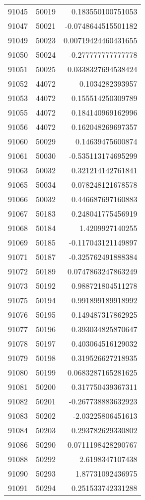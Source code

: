 \begin{tabular}{r | r | r}
91045 & 50019 & 0.183550100751053 \\
91047 & 50021 & -0.0748644515501182 \\
91049 & 50023 & 0.00719424460431655 \\
91050 & 50024 & -0.277777777777778 \\
91051 & 50025 & 0.0338327694538424 \\
91052 & 44072 & 0.1034282393957 \\
91053 & 44072 & 0.155514250309789 \\
91055 & 44072 & 0.184140969162996 \\
91056 & 44072 & 0.162048269697357 \\
91060 & 50029 & 0.14639475600874 \\
91061 & 50030 & -0.535113174695299 \\
91063 & 50032 & 0.321214142761841 \\
91065 & 50034 & 0.078248121678578 \\
91066 & 50032 & 0.446687697160883 \\
91067 & 50183 & 0.248041775456919 \\
91068 & 50184 & 1.4209927140255 \\
91069 & 50185 & -0.117043121149897 \\
91071 & 50187 & -0.325762491888384 \\
91072 & 50189 & 0.0747863247863249 \\
91073 & 50192 & 0.988721804511278 \\
91075 & 50194 & 0.991899189918992 \\
91076 & 50195 & 0.149487317862925 \\
91077 & 50196 & 0.393034825870647 \\
91078 & 50197 & 0.403064516129032 \\
91079 & 50198 & 0.319526627218935 \\
91080 & 50199 & 0.0683287165281625 \\
91081 & 50200 & 0.317750439367311 \\
91082 & 50201 & -0.267738883632923 \\
91083 & 50202 & -2.03225806451613 \\
91084 & 50203 & 0.293782629330802 \\
91086 & 50290 & 0.0711198428290767 \\
91088 & 50292 & 2.6198347107438 \\
91090 & 50293 & 1.87731092436975 \\
91091 & 50294 & 0.251533742331288 \\

\end{tabular}
